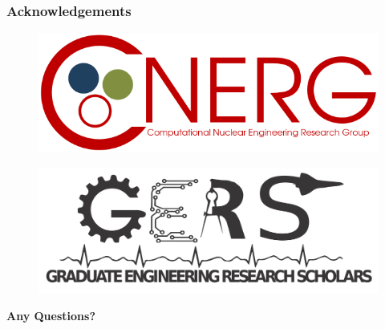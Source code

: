 \begin{frame}
  \frametitle{Acknowledgements}
    \begin{figure}
      \centering
      \includegraphics[height=0.15\textheight]{./figures/cnerg-logo.png}
    \end{figure}
    \begin{figure}
      \centering
      \includegraphics[height=0.15\textheight]{./figures/gers-logo.png}
    \end{figure}
\end{frame}

\begin{frame}
  \centering \textbf{\Large Any Questions?}
  \begin{figure}
    \centering
  \end{figure}
\end{frame}

